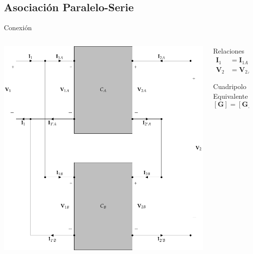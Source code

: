 \documentclass[xcolor={usenames,svgnames,dvipsnames}]{beamer}
\begin{document}
\subsection{Asociación Paralelo-Serie}
\label{sec:org96cbb34}
\begin{frame}[label={sec:org9af3c80}]{Conexión}
\begin{columns}
\begin{column}{0.7\columnwidth}
\begin{center}
\includegraphics[height=0.75\textheight]{../figs/paralelo-serie.pdf}
\end{center}
\end{column}
\begin{column}{0.35\columnwidth}
\begin{block}{Relaciones}
\begin{align*}
  \mathbf{I}_1 &= \mathbf{I}_{1A} + \mathbf{I}_{1B}\\
  \mathbf{V}_2 &= \mathbf{V}_{2A} + \mathbf{V}_{2B}
\end{align*}
\end{block}

\begin{block}{Cuadripolo Equivalente}
\[
  \boxed{[\mathbf{G}] = [\mathbf{G}_A] + [\mathbf{G}_B]}
\]
\end{block}
\end{column}
\end{columns}
\end{frame}
\end{document}

